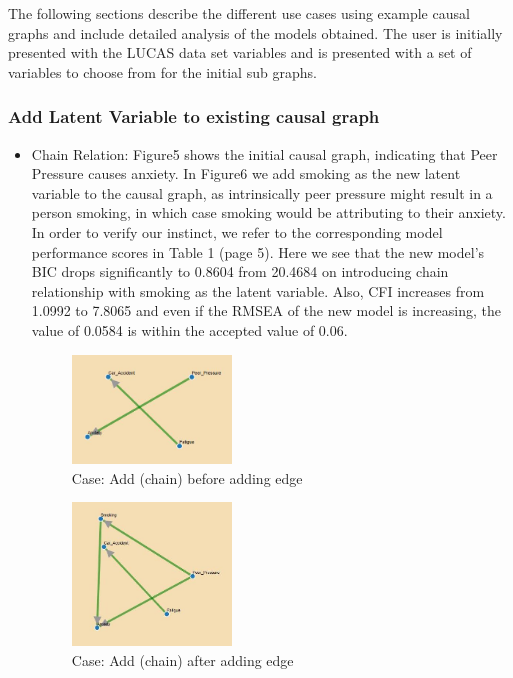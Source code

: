 \documentclass{vgtc}                          %
\begin{document}
The following sections describe the different use cases using example causal graphs and include detailed analysis of the models obtained. The user is initially presented with the LUCAS data set variables and is presented with a set of variables to choose from for the initial sub graphs. 

\subsubsection{Add Latent Variable to existing causal graph}
\begin{itemize}
    \item Chain Relation: Figure5 shows the initial causal graph, indicating that Peer Pressure causes anxiety. In Figure6 we add smoking as the new latent variable to the causal graph, as intrinsically peer pressure might result in a person smoking, in which case smoking would be attributing to their anxiety. In order to verify our instinct, we refer to the corresponding model performance scores in Table 1 (page 5). Here we see that the new model's BIC drops significantly to 0.8604 from 20.4684 on introducing chain relationship with smoking as the latent variable. Also, CFI increases from 1.0992 to 7.8065 and even if the RMSEA of the new model is increasing, the value of 0.0584 is within the accepted value of 0.06.

    \begin{figure}[H]
      \caption{Case: Add (chain) before adding edge}
      \centering
      \includegraphics[width=0.4\textwidth]{c1_1}
    \end{figure}
    
    \begin{figure}[H]
      \caption{Case: Add (chain) after adding edge}
      \centering
      \includegraphics[width=0.4\textwidth]{c1_2}
    \end{figure}


\end{itemize}
\end{document}
